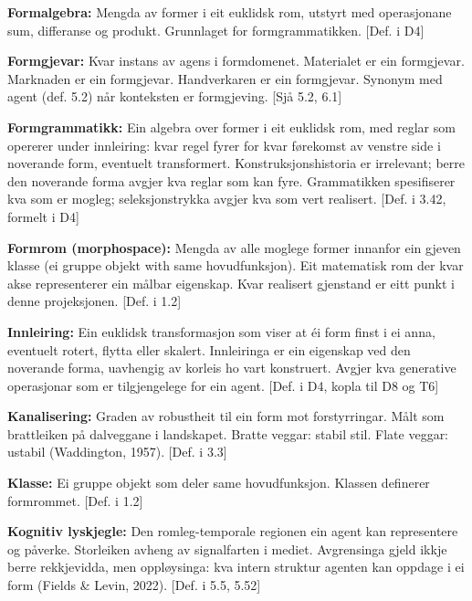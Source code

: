 \documentclass[10pt]{article}
\begin{document}
\textbf{Formalgebra:} Mengda av former i eit euklidsk rom, utstyrt med operasjonane sum, differanse og produkt. Grunnlaget for formgrammatikken. [Def. i D4]




\textbf{Formgjevar:} Kvar instans av agens i formdomenet. Materialet er ein formgjevar. Marknaden er ein formgjevar. Handverkaren er ein formgjevar. Synonym med agent (def. 5.2) når konteksten er formgjeving. [Sjå 5.2, 6.1]




\textbf{Formgrammatikk:} Ein algebra over former i eit euklidsk rom, med reglar som opererer under innleiring: kvar regel fyrer for kvar førekomst av venstre side i noverande form, eventuelt transformert. Konstruksjonshistoria er irrelevant; berre den noverande forma avgjer kva reglar som kan fyre. Grammatikken spesifiserer kva som er mogleg; seleksjonstrykka avgjer kva som vert realisert. [Def. i 3.42, formelt i D4]




\textbf{Formrom (morphospace):} Mengda av alle moglege former innanfor ein gjeven klasse (ei gruppe objekt with same hovudfunksjon). Eit matematisk rom der kvar akse representerer ein målbar eigenskap. Kvar realisert gjenstand er eitt punkt i denne projeksjonen. [Def. i 1.2]




\textbf{Innleiring:} Ein euklidsk transformasjon som viser at éi form finst i ei anna, eventuelt rotert, flytta eller skalert. Innleiringa er ein eigenskap ved den noverande forma, uavhengig av korleis ho vart konstruert. Avgjer kva generative operasjonar som er tilgjengelege for ein agent. [Def. i D4, kopla til D8 og T6]




\textbf{Kanalisering:} Graden av robustheit til ein form mot forstyrringar. Målt som brattleiken på dalveggane i landskapet. Bratte veggar: stabil stil. Flate veggar: ustabil (Waddington, 1957). [Def. i 3.3]




\textbf{Klasse:} Ei gruppe objekt som deler same hovudfunksjon. Klassen definerer formrommet. [Def. i 1.2]




\textbf{Kognitiv lyskjegle:} Den romleg-temporale regionen ein agent kan representere og påverke. Storleiken avheng av signalfarten i mediet. Avgrensinga gjeld ikkje berre rekkjevidda, men oppløysinga: kva intern struktur agenten kan oppdage i ei form (Fields \& Levin, 2022). [Def. i 5.5, 5.52]
\end{document}
